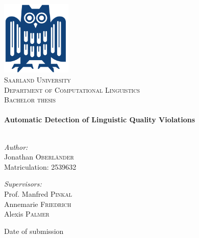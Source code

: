 \begin{titlepage}
\begin{center}

\includegraphics[width=0.25\textwidth]{./eule}~\\[1cm]

\textsc{\LARGE Saarland  University}\\[0.4cm]
\textsc{\Large Department of Computational Linguistics}\\[1.5cm]

\textsc{\Large Bachelor thesis}\\[0.5cm]


\HRule \\[1.0cm]

{ \huge \bfseries Automatic Detection of Linguistic Quality Violations}\\[0.4cm]

\HRule \\[1.5cm]

\begin{minipage}{0.4\textwidth}
\begin{flushleft} \large
\emph{Author:}\\
Jonathan \textsc{Oberländer}\\
Matriculation: 2539632
\end{flushleft}
\end{minipage}
\begin{minipage}{0.4\textwidth}
\begin{flushright} \large
\emph{Supervisors:} \\
Prof. Manfred \textsc{Pinkal}\\
Annemarie \textsc{Friedrich}\\
Alexis \textsc{Palmer}\\
\end{flushright}
\end{minipage}

\vfill

{\large Date of submission}

\end{center}
\end{titlepage}
